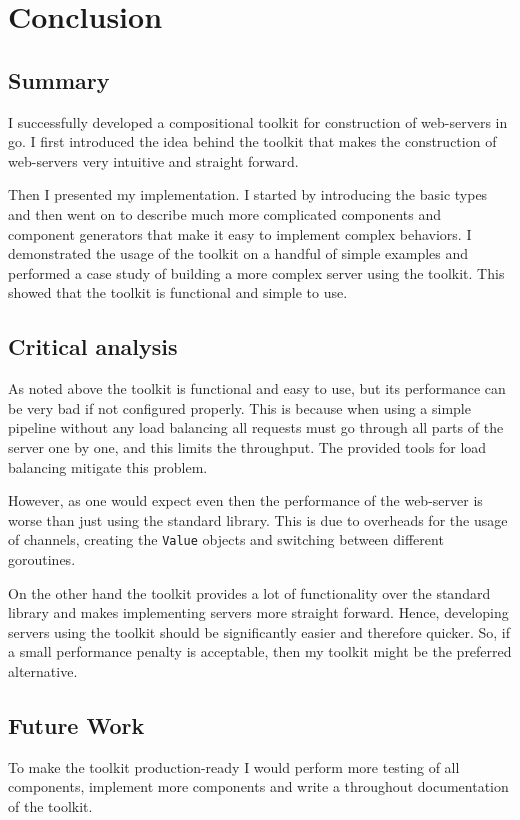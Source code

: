 \section{Conclusion}
\label{sec:conclusion}
\subsection{Summary}
I successfully developed a compositional toolkit for construction of 
web-servers in go. I first introduced the idea behind the toolkit that 
makes the construction of web-servers very intuitive and straight forward. 

Then I presented my implementation. I started by introducing the basic types
and then went on to describe much more complicated components and component generators
that make it easy to implement complex behaviors. I demonstrated the usage of the 
toolkit on a handful of simple examples and performed a case study of building
a more complex server using the toolkit. This showed that the toolkit is
functional and simple to use. 


\subsection{Critical analysis}
As noted above the toolkit is functional and easy to use, but its performance
can be very bad if not configured properly. This is because when using a simple
pipeline without any load balancing all requests must go through all parts
of the server one by one, and this limits the throughput. The provided
tools for load balancing mitigate this problem.

However, as one would expect even then the performance of the web-server
is worse than just using the standard library. This is due to overheads
for the usage of channels, creating the \texttt{Value} objects
and switching between different goroutines.

On the other hand the toolkit provides a lot of functionality over the
standard library and makes implementing servers more straight forward. 
Hence, developing servers using the toolkit should be
significantly easier and therefore quicker. So, if a small performance
penalty is acceptable, then my toolkit might be the preferred alternative.

\subsection{Future Work}
To make the toolkit production-ready I would perform more testing of all
components, implement more components and write a throughout documentation
of the toolkit. 

